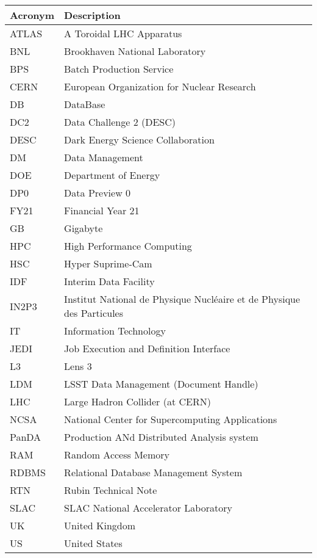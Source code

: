 \addtocounter{table}{-1}
\begin{longtable}{p{}p{}}\hline
\textbf{Acronym} & \textbf{Description}  \\\hline

ATLAS & A Toroidal LHC Apparatus \\\hline
BNL & Brookhaven National Laboratory \\\hline
BPS & Batch Production Service \\\hline
CERN & European Organization for Nuclear Research \\\hline
DB & DataBase \\\hline
DC2 & Data Challenge 2 (DESC) \\\hline
DESC & Dark Energy Science Collaboration \\\hline
DM & Data Management \\\hline
DOE & Department of Energy \\\hline
DP0 & Data Preview 0 \\\hline
FY21 & Financial Year 21 \\\hline
GB & Gigabyte \\\hline
HPC & High Performance Computing \\\hline
HSC & Hyper Suprime-Cam \\\hline
IDF & Interim Data Facility \\\hline
IN2P3 & Institut National de Physique Nucléaire et de Physique des Particules \\\hline
IT & Information Technology \\\hline
JEDI & Job Execution and Definition Interface \\\hline
L3 & Lens 3 \\\hline
LDM & LSST Data Management (Document Handle) \\\hline
LHC & Large Hadron Collider (at CERN) \\\hline
NCSA & National Center for Supercomputing Applications \\\hline
PanDA &  Production ANd Distributed Analysis system \\\hline
RAM & Random Access Memory \\\hline
RDBMS & Relational Database Management System  \\\hline
RTN & Rubin Technical Note \\\hline
SLAC & SLAC National Accelerator Laboratory \\\hline
UK & United Kingdom \\\hline
US & United States \\\hline
\end{longtable}
